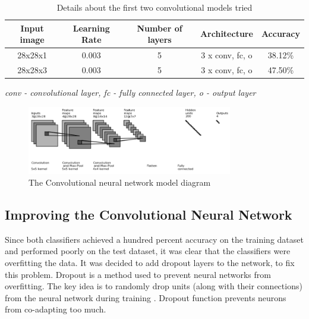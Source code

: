 \begin{table}[h]
\begin{center}
\begin{tabular}{ |c|c|c|c|c| }
\hline
 Input image&Learning Rate &   Number of layers & Architecture & Accuracy \\   \hline
28x28x1 & 0.003   &   5  &  3 x conv, fc, o  & 38.12\% \\
28x28x3 & 0.003   &   5  &  3 x conv, fc, o  & 47.50\% \\
 \hline
\end{tabular}
\caption{Details about the first two convolutional models tried}

\label{table:convi}
\textit{ conv - convolutional layer, fc - fully connected layer, o - output layer}
\end{center}
\end{table}


\begin{figure}[h]
\centering
\includegraphics[width=0.8\textwidth]{Figures/4/conv_diagram.PNG}
\caption{The  Convolutional neural network model diagram }
\label{fig:conv2}
\end{figure}


\subsection{Improving the Convolutional Neural Network}

Since both classifiers achieved a hundred percent accuracy on the training dataset and performed poorly on the test dataset, it was clear that the classifiers were overfitting the data. It was decided to add dropout layers to the network, to fix this problem. Dropout is a method used to prevent neural networks from overfitting. The key idea is to randomly drop units (along with their connections) from the neural network during training \cite{dropout}. Dropout function prevents neurons from co-adapting too much. 

